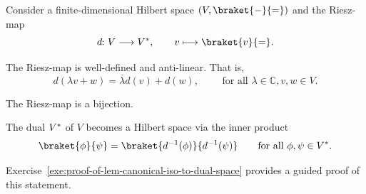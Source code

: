 \documentclass[a4paper, oneside, 12pt]{amsart}
\begin{document}
\begin{lemma}\label{lem:canonical-iso-to-dual-space}
  Consider a finite-dimensional Hilbert space \((V, \braket{\blank}{\bblank})\) and the
  Riesz-map
  \begin{equation}
    d \from V \to \rd*{V}, \qquad v \mapsto \braket{v}{\bblank}.
  \end{equation}
  \begin{thmlist}
    \item The Riesz-map is well-defined and anti-linear. That is,
    \begin{equation}
      d(\lambda v+w ) = \overline{\lambda} d(v) + d(w), \qquad \text{ for all }\lambda\in \mathbb{C}, v, w \in V.
    \end{equation}
    \item The Riesz-map is a bijection.
    \item The dual \(\rd*{V}\) of \(V\) becomes a Hilbert space via the inner product
    \begin{equation*}
      \braket{\phi}{\psi} = \braket{d^{-1}(\phi)}{d^{-1}(\psi)} \qquad \text{for all } \phi, \psi \in \rd*{V}.
    \end{equation*}
  \end{thmlist}
\end{lemma}
Exercise~\ref{exe:proof-of-lem-canonical-iso-to-dual-space} provides a guided proof of this statement.
\end{document}
